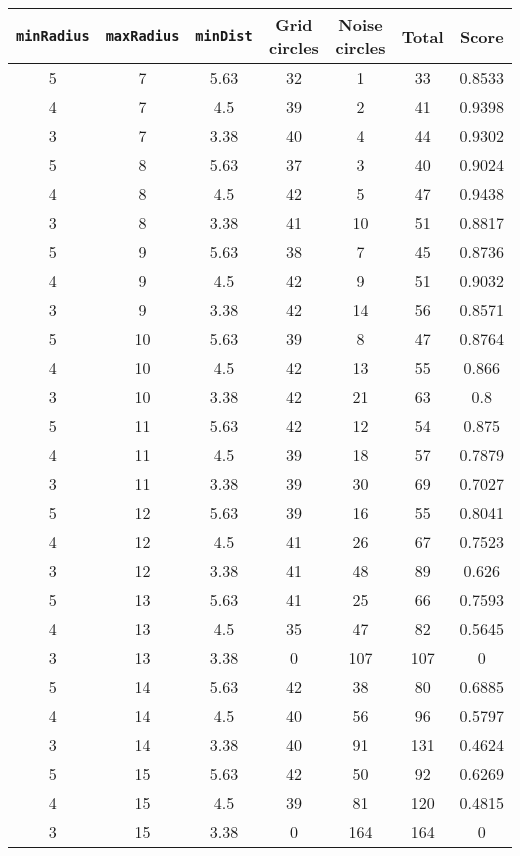 \documentclass[letterpaper, 12pt]{article}
\begin{document}
\begin{longtable}{|c|c|c|c|c|c|c|}
\hline
\textbf{\texttt{minRadius}} & \textbf{\texttt{maxRadius}} & \textbf{\texttt{minDist}} & \textbf{Grid circles} & \textbf{Noise circles} & \textbf{Total} & \textbf{Score} \\
\hline
5 & 7 & 5.63 & 32 & 1 & 33 & 0.8533 \\
\hline
4 & 7 & 4.5 & 39 & 2 & 41 & 0.9398 \\
\hline
3 & 7 & 3.38 & 40 & 4 & 44 & 0.9302 \\
\hline
5 & 8 & 5.63 & 37 & 3 & 40 & 0.9024 \\
\hline
4 & 8 & 4.5 & 42 & 5 & 47 & 0.9438 \\
\hline
3 & 8 & 3.38 & 41 & 10 & 51 & 0.8817 \\
\hline
5 & 9 & 5.63 & 38 & 7 & 45 & 0.8736 \\
\hline
4 & 9 & 4.5 & 42 & 9 & 51 & 0.9032 \\
\hline
3 & 9 & 3.38 & 42 & 14 & 56 & 0.8571 \\
\hline
5 & 10 & 5.63 & 39 & 8 & 47 & 0.8764 \\
\hline
4 & 10 & 4.5 & 42 & 13 & 55 & 0.866 \\
\hline
3 & 10 & 3.38 & 42 & 21 & 63 & 0.8 \\
\hline
5 & 11 & 5.63 & 42 & 12 & 54 & 0.875 \\
\hline
4 & 11 & 4.5 & 39 & 18 & 57 & 0.7879 \\
\hline
3 & 11 & 3.38 & 39 & 30 & 69 & 0.7027 \\
\hline
5 & 12 & 5.63 & 39 & 16 & 55 & 0.8041 \\
\hline
4 & 12 & 4.5 & 41 & 26 & 67 & 0.7523 \\
\hline
3 & 12 & 3.38 & 41 & 48 & 89 & 0.626 \\
\hline
5 & 13 & 5.63 & 41 & 25 & 66 & 0.7593 \\
\hline
4 & 13 & 4.5 & 35 & 47 & 82 & 0.5645 \\
\hline
3 & 13 & 3.38 & 0 & 107 & 107 & 0 \\
\hline
5 & 14 & 5.63 & 42 & 38 & 80 & 0.6885 \\
\hline
4 & 14 & 4.5 & 40 & 56 & 96 & 0.5797 \\
\hline
3 & 14 & 3.38 & 40 & 91 & 131 & 0.4624 \\
\hline
5 & 15 & 5.63 & 42 & 50 & 92 & 0.6269 \\
\hline
4 & 15 & 4.5 & 39 & 81 & 120 & 0.4815 \\
\hline
3 & 15 & 3.38 & 0 & 164 & 164 & 0 \\

\end{longtable}
\end{document}
